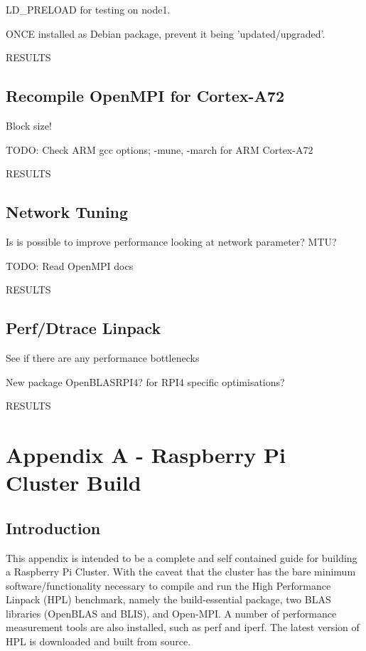 \documentclass{article}
\begin{document}
LD\_PRELOAD for testing on node1.

ONCE installed as Debian package, prevent it being 'updated/upgraded'.

RESULTS

\subsection{Recompile OpenMPI for Cortex-A72}

Block size!

TODO: Check ARM gcc options; -mune, -march for ARM Cortex-A72

RESULTS

\subsection{Network Tuning}
Is is possible to improve performance looking at network parameter? MTU? 

TODO: Read OpenMPI docs

RESULTS

\subsection{Perf/Dtrace Linpack}
See if there are any performance bottlenecks

New package OpenBLASRPI4? for RPI4 specific optimisations?

RESULTS

%
%
\clearpage\section{Appendix A - Raspberry Pi Cluster Build}

\subsection{Introduction}

This appendix is intended to be a complete and self contained guide for building a Raspberry Pi Cluster. With the caveat that the cluster has the bare minimum software/functionality necessary to compile and run the High Performance Linpack (HPL) benchmark, namely the build-essential package, two BLAS libraries (OpenBLAS and BLIS), and Open-MPI. A number of performance measurement tools are also installed, such as perf and iperf. The latest version of HPL is downloaded and built from source.
\end{document}
